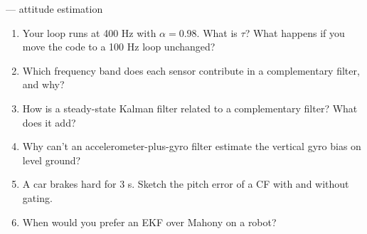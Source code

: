 \begin{frame}{\checkq{} --- attitude estimation}
  \begin{enumerate}
    \item Your loop runs at 400 Hz with $\alpha=0.98$. What is $\tau$? What happens if you move the code to a 100 Hz loop unchanged?
    \item Which frequency band does each sensor contribute in a complementary filter, and why?
    \item How is a steady-state Kalman filter related to a complementary filter? What does it add?
    \item Why can't an accelerometer-plus-gyro filter estimate the vertical gyro bias on level ground?
    \item A car brakes hard for 3 s. Sketch the pitch error of a CF with and without gating.
    \item When would you prefer an EKF over Mahony on a robot?
  \end{enumerate}
\end{frame}
